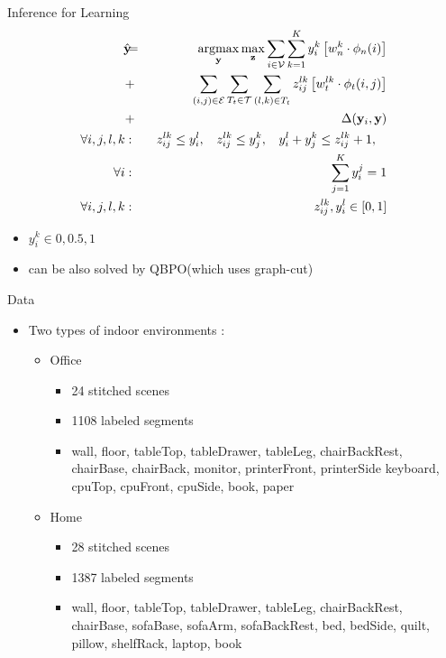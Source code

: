 \documentclass{beamer}
\DeclareMathOperator*{\argmax}{argmax}
\newcommand{\y}{{\mathbf y}}     %
\newcommand{\ysc}[2]{{y_{#1}^{#2}}}    %
\newcommand{\zsc}[2]{{z_{#1}^{#2}}}    %
\newcommand{\fn}[1]{{\phi_n(#1)}}      %
\newcommand{\fe}[3]{{\phi_{#1}(#2,#3)}}%
\newcommand{\wn}[1]{{w_n^{#1}}}        %
\newcommand{\we}[3]{{w_{#1}^{#2#3}}}   %
\newcommand{\loss}[2]{{\Delta(#1,#2)}}   %
\begin{document}
\begin{frame}{Inference for Learning}
 \begin{eqnarray*}
\hat{\y}\!\!\!&=&\!\!\!\argmax_{\y}\max_{\mathbf z} \sum_{i \in \mathcal{V}} \sum_{k=1}^{K} \ysc{i}{k} \left[\wn{k} \cdot \fn{i} \right] \\
&+&  \!\!\!\sum_{(i,j)\in \mathcal{E}}  \sum_{T_t \in {\cal T}} \sum_{(l,k)\in T_t} \zsc{ij}{lk} \left[\we{t}{l}{k} \cdot \fe{t}{i}{j}\right] \\
&+& \loss{\y_i}{\y} \label{eq:relaxobj}\\
\forall i,j,l,k &:& \:\: \zsc{ij}{lk}\le \ysc{i}{l}, \:\:\:\:
\zsc{ij}{lk}\le \ysc{j}{k},\:\:\:\:
\ysc{i}{l} + \ysc{j}{k} \le \zsc{ij}{lk}+1,\:\:\:\: \\
\forall i &:& \sum_{j=1}^{K} y_i^j = 1\\
\forall i,j,l,k &:& \zsc{ij}{lk},\ysc{i}{l} \in [ 0,1 ] \label{eq:relaxconst}
\end{eqnarray*} 

\begin{itemize}
 \item $y_i^k\in{0,0.5,1}$
 \item can be also solved by QBPO(which uses graph-cut)
\end{itemize}
\end{frame}


\begin{frame}{Data}
\begin{itemize}
   \item Two types of indoor environments : 
   \begin{itemize}
   \item Office 
   	\begin{itemize}
	\item 24 stitched scenes
	\item 1108 labeled segments
	\item wall, floor, tableTop, tableDrawer, tableLeg, chairBackRest, chairBase, chairBack, monitor, printerFront, printerSide keyboard, cpuTop, cpuFront, cpuSide, book, paper
	\end{itemize}
   \item Home
   	\begin{itemize}
   	\item  28 stitched scenes
	\item 1387 labeled segments
	\item wall, floor, tableTop, tableDrawer, tableLeg, chairBackRest, chairBase, sofaBase, sofaArm, sofaBackRest, bed, bedSide, quilt, pillow, shelfRack, laptop, book 
	\end{itemize} 
\end{itemize}
\end{itemize}
\end{frame}
\end{document}
